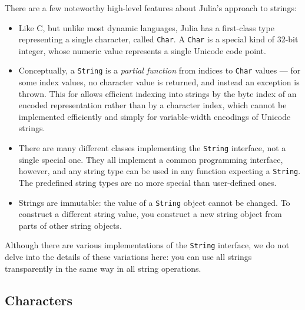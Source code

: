\documentclass{article}
\begin{document}
There are a few noteworthy high-level features about Julia's approach to strings:
\begin{itemize}
\item Like C, but unlike most dynamic languages, Julia has a first-class type representing a single character, called \verb|Char|.
A \verb|Char| is a special kind of 32-bit integer, whose numeric value represents a single Unicode code point.
\item Conceptually, a \verb|String| is a \emph{partial function} from indices to \verb|Char| values --- for some index values, no character value is returned, and instead an exception is thrown.
This for allows efficient indexing into strings by the byte index of an encoded representation rather than by a character index, which cannot be implemented efficiently and simply for variable-width encodings of Unicode strings.
\item There are many different classes implementing the \verb|String| interface, not a single special one.
They all implement a common programming interface, however, and any string type can be used in any function expecting a \verb|String|.
The predefined string types are no more special than user-defined ones.
\item Strings are immutable: the value of a \verb|String| object cannot be changed.
To construct a different string value, you construct a new string object from parts of other string objects.
\end{itemize}
Although there are various implementations of the \verb|String| interface, we do not delve into the details of these variations here:
you can use all strings transparently in the same way in all string operations.

\subsection{Characters}
\end{document}
